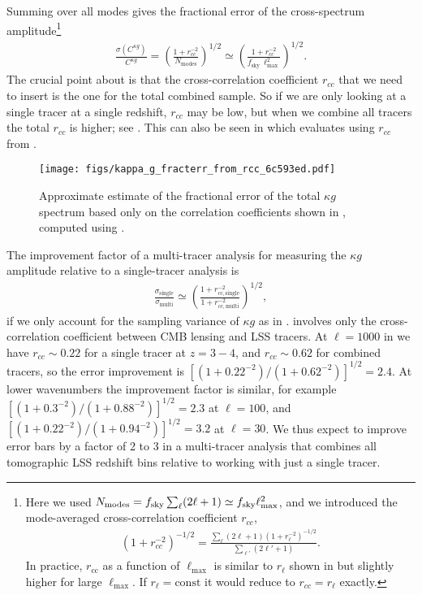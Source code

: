 \documentclass[prd,superscriptaddress,floatfix,notitlepage,nofootinbib,reprint]{revtex4-1} %
\begin{document}
Summing over all modes gives the fractional error of the cross-spectrum amplitude\footnote{Here we used $N_\mathrm{modes}={f_\mathrm{sky}}\sum_\ell(2\ell+1)\simeq {f_\mathrm{sky}}\ell_\mathrm{max}^2$, and we introduced the mode-averaged cross-correlation coefficient $r_{cc}$,
\begin{align}
  \label{eq:30}
(1+r_{cc}^{-2})^{-1/2}=\frac{\sum_\ell (2\ell+1)(1+r_\ell^{-2})^{-1/2}}{\sum_{\ell'}(2\ell'+1)}.
\end{align}
In practice, $r_\mathrm{cc}$ as a function of $\ell_\mathrm{max}$ is similar to $r_\ell$ shown in  but slightly higher for large $\ell_\mathrm{max}$.  If $r_\ell=\mathrm{const}$ it would reduce to $r_{cc}=r_\ell$ exactly.
}
\begin{align}
  \label{eq:CrossFractError}
\frac{\sigma(C^{\kappa g})}{C^{\kappa g}}
=\left(\frac{1+r_{cc}^{-2}}{N_\mathrm{modes}}\right)^{1/2}
\simeq\left(\frac{1+r_{cc}^{-2}}{f_\mathrm{sky}\,\ell_\mathrm{max}^2}\right)^{1/2}.
\end{align}
The crucial point about  is that the cross-correlation coefficient $r_{cc}$ that we need to insert is the one for the total combined sample. 
So if we are only looking at a single tracer at a single redshift, $r_{cc}$ may be low, but when we combine all tracers the total $r_{cc}$ is higher; see .
This can also be seen in  which evaluates  using $r_{cc}$ from .

\begin{figure}[tbp]
\texttt{[image: figs/kappa\_g\_fracterr\_from\_rcc\_6c593ed.pdf]}
\caption{Approximate estimate of the fractional error of the total $\kappa g$ spectrum based only on the correlation coefficients shown in , computed using . 
}
\label{fig:KappaGFractErrorEstimate}
\end{figure}

The improvement factor of a multi-tracer analysis for measuring the $\kappa g$ amplitude relative to a single-tracer analysis is
\begin{align}
  \label{eq:MultiVsSingleImprov}
  \frac{\sigma_\mathrm{single}}{\sigma_\mathrm{multi}}\simeq
\left(\frac{1+r_{cc,\mathrm{single}}^{-2}}{1+r_{cc,\mathrm{multi}}^{-2}}\right)^{1/2},
\end{align}
if we only account for the sampling variance of $\kappa g$ as in .
 involves only the cross-correlation coefficient between CMB lensing and LSS tracers.
At $\ell=1000$ in  we have $r_{cc} \sim 0.22$ for a single tracer at $z=3-4$,
and $r_{cc} \sim 0.62$ for combined tracers, so the error improvement is $[(1+0.22^{-2})/(1+0.62^{-2})]^{1/2} = 2.4$.
At lower wavenumbers the improvement factor is similar, for example $[(1+0.3^{-2})/(1+0.88^{-2})]^{1/2}=2.3$ at $\ell=100$, and $[(1+0.22^{-2})/(1+0.94^{-2})]^{1/2}=3.2$ at $\ell=30$.
We thus expect to improve error bars by a factor of 2 to 3 in a multi-tracer analysis that combines all tomographic LSS redshift bins relative to working with just a single tracer.
\end{document}
